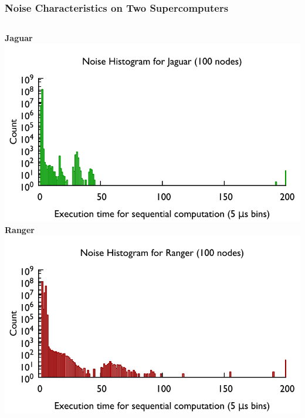 \begin{frame}
\frametitle{Noise Characteristics on Two Supercomputers}
\begin{columns}
\centering \textbf{Jaguar} \\
\includegraphics[width=\textwidth]{images/noise_shist_jaguar}
\centering \textbf{Ranger} \\
\includegraphics[width=\textwidth]{images/noise_shist_ranger}
\end{columns}
\end{frame} 

 
